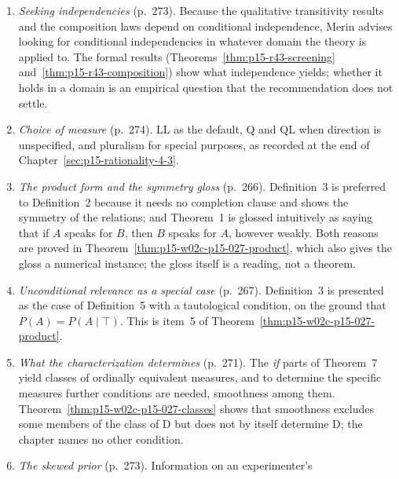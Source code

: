 \begin{enumerate}
  independence, with every case of the hypothesis in
  Theorem~\ref{thm:p15-w02c-p15-027-lemma3}; disjunction of disjoint
  sources, with the boundary cases in
  Theorem~\ref{thm:p15-w02c-p15-027-mixture}); Carnap's additivity
  for conjunction when \(P(A\vee B)=1\), in the last theorem, is his
  example of one that is neither useful nor intuitive. The general
  existence claim is Theorem~\ref{thm:p15-w02c-p15-027-homomorphism}
  below.
\item \emph{Seeking independencies} (p.~273). Because the qualitative
  transitivity results and the composition laws depend on conditional
  independence, Merin advises looking for conditional independencies
  in whatever domain the theory is applied to. The formal results
  (Theorems~\ref{thm:p15-r43-screening} and~\ref{thm:p15-r43-composition})
  show what independence yields; whether it holds in a domain is an
  empirical question that the recommendation does not settle.
\item \emph{Choice of measure} (p.~274). LL as the default, Q and QL
  when direction is unspecified, and pluralism for special purposes, as
  recorded at the end of Chapter~\ref{sec:p15-rationality-4-3}.
\item \emph{The product form and the symmetry gloss} (p.~266).
  Definition~3 is preferred to Definition~2 because it needs no
  completion clause and shows the symmetry of the relations; and
  Theorem~1 is glossed intuitively as saying that if \(A\) speaks for
  \(B\), then \(B\) speaks for \(A\), however weakly. Both reasons are
  proved in Theorem~\ref{thm:p15-w02c-p15-027-product}, which also gives
  the gloss a numerical instance; the gloss itself is a reading, not a
  theorem.
\item \emph{Unconditional relevance as a special case} (p.~267).
  Definition~3 is presented as the case of Definition~5 with a
  tautological condition, on the ground that \(P(A)=P(A\mid\top)\).
  This is item~5 of Theorem~\ref{thm:p15-w02c-p15-027-product}.
\item \emph{What the characterization determines} (p.~271). The
  \emph{if} parts of Theorem~7 yield classes of ordinally equivalent
  measures, and to determine the specific measures further conditions
  are needed, smoothness among them. Theorem~\ref{thm:p15-w02c-p15-027-classes} shows
  that smoothness excludes some members of the class of D but does not
  by itself determine D; the chapter names no other condition.
\item \emph{The skewed prior} (p.~273). Information on an experimenter's

\end{enumerate}
